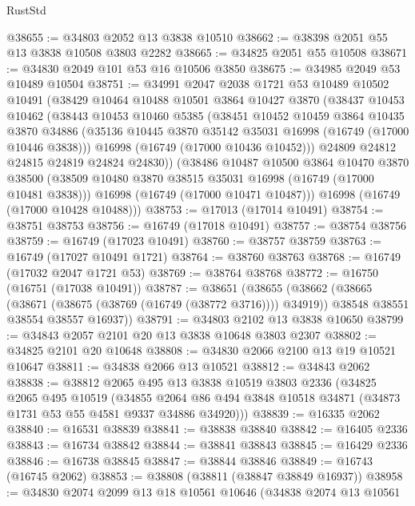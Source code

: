 \begin{lexlean}{RustStd}
\begin{coremodule}
@38655 := @34803 @2052 @13 @3838 @10510
@38662 := @38398 @2051 @55 @13 @3838 @10508 @3803 @2282
@38665 := @34825 @2051 @55 @10508
@38671 := @34830 @2049 @101 @53 @16 @10506 @3850
@38675 := @34985 @2049 @53 @10489 @10504
@38751 := @34991
    @2047
    @2038
    @1721
    @53
    @10489
    @10502
    @10491
    (@38429
      @10464
      @10488
      @10501
      @3864
      @10427
      @3870
      (@38437
        @10453
        @10462
        (@38443
          @10453
          @10460
          @5385
          (@38451
            @10452
            @10459
            @3864
            @10435
            @3870
            @34886
            (@35136 @10445 @3870 @35142 @35031 @16998 (@16749 (@17000 @10446 @3838)))
            @16998
            (@16749 (@17000 @10436 @10452)))
          @24809
          @24812
          @24815
          @24819
          @24824
          @24830))
      (@38486
        @10487
        @10500
        @3864
        @10470
        @3870
        @38500
        (@38509 @10480 @3870 @38515 @35031 @16998 (@16749 (@17000 @10481 @3838)))
        @16998
        (@16749 (@17000 @10471 @10487)))
      @16998
      (@16749 (@17000 @10428 @10488)))
@38753 := @17013 (@17014 @10491)
@38754 := @38751 @38753
@38756 := @16749 (@17018 @10491)
@38757 := @38754 @38756
@38759 := @16749 (@17023 @10491)
@38760 := @38757 @38759
@38763 := @16749 (@17027 @10491 @1721)
@38764 := @38760 @38763
@38768 := @16749 (@17032 @2047 @1721 @53)
@38769 := @38764 @38768
@38772 := @16750 (@16751 (@17038 @10491))
@38787 := @38651
    (@38655
      (@38662
        (@38665 (@38671 (@38675 (@38769 (@16749 (@38772 @3716)))) @34919))
        @38548
        @38551
        @38554
        @38557
        @16937))
@38791 := @34803 @2102 @13 @3838 @10650
@38799 := @34843 @2057 @2101 @20 @13 @3838 @10648 @3803 @2307
@38802 := @34825 @2101 @20 @10648
@38808 := @34830 @2066 @2100 @13 @19 @10521 @10647
@38811 := @34838 @2066 @13 @10521
@38812 := @34843 @2062
@38838 := @38812
    @2065
    @495
    @13
    @3838
    @10519
    @3803
    @2336
    (@34825
      @2065
      @495
      @10519
      (@34855 @2064 @86 @494 @3848 @10518 @34871 (@34873 @1731 @53 @55 @4581 @9337 @34886 @34920)))
@38839 := @16335 @2062
@38840 := @16531 @38839
@38841 := @38838 @38840
@38842 := @16405 @2336
@38843 := @16734 @38842
@38844 := @38841 @38843
@38845 := @16429 @2336
@38846 := @16738 @38845
@38847 := @38844 @38846
@38849 := @16743 (@16745 @2062)
@38853 := @38808 (@38811 (@38847 @38849 @16937))
@38958 := @34830
    @2074
    @2099
    @13
    @18
    @10561
    @10646
    (@34838
      @2074
      @13
      @10561

\end{coremodule}
\end{lexlean}
